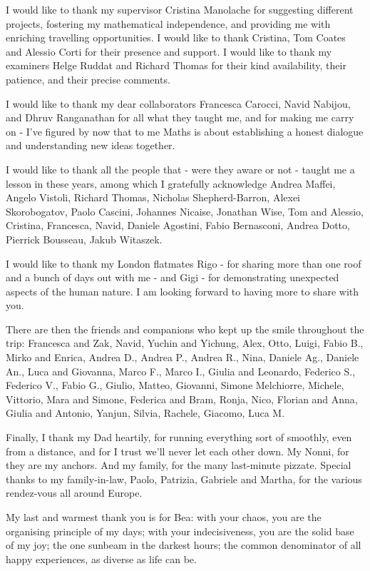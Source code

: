 \documentclass[a4paper,11pt,twoside,final]{book}
\theoremstyle{definition}
\theoremstyle{definition}
\numberwithin{equation}{chapter}    %
\numberwithin{section}{chapter} %
\begin{document}
{\thispagestyle{empty}

\null
\vfill


\medskip

\noindent I would like to thank my supervisor Cristina Manolache for suggesting different projects, fostering my mathematical independence, and providing me with enriching travelling opportunities. I would like to thank Cristina, Tom Coates and Alessio Corti for their presence and support. I would like to thank my examiners Helge Ruddat and Richard Thomas for their kind availability, their patience, and their precise comments.

I would like to thank my dear collaborators Francesca Carocci, Navid Nabijou, and Dhruv Ranganathan for all what they taught me, and for making me carry on - I've figured by now that to me Maths is about establishing a honest dialogue and understanding new ideas together.

I would like to thank all the people that - were they aware or not - taught me a lesson in these years, among which I gratefully acknowledge Andrea Maffei, Angelo Vistoli, Richard Thomas, Nicholas Shepherd-Barron, Alexei Skorobogatov, Paolo Cascini, Johannes Nicaise, Jonathan Wise, Tom and Alessio, Cristina, Francesca, Navid, Daniele Agostini, Fabio Bernasconi, Andrea Dotto, Pierrick Bousseau, Jakub Witaszek.

I would like to thank my London flatmates Rigo - for sharing more than one roof and a bunch of days out with me - and Gigi - for demonstrating unexpected aspects of the human nature. I am looking forward to having more to share with you.

There are then the friends and companions who kept up the smile throughout the trip: Francesca and Zak, Navid, Yuchin and Yichung, Alex, Otto, Luigi, Fabio B., Mirko and Enrica, Andrea D., Andrea P., Andrea R., Nina, Daniele Ag., Daniele An., Luca and Giovanna, Marco F., Marco I., Giulia and Leonardo, Federico S., Federico V., Fabio G., Giulio, Matteo, Giovanni, Simone Melchiorre, Michele, Vittorio, Mara and Simone, Federica and Bram, Ronja, Nico, Florian and Anna, Giulia and Antonio, Yanjun, Silvia, Rachele, Giacomo, Luca M.

Finally, I thank my Dad heartily, for running everything sort of smoothly, even from a distance, and for I trust we'll never let each other down. My Nonni, for they are my anchors. And my family, for the many last-minute pizzate. Special thanks to my family-in-law, Paolo, Patrizia, Gabriele and Martha, for the various rendez-vous all around Europe.

My last and warmest thank you is for Bea: with your chaos, you are the organising principle of my days; with your indecisiveness, you are the solid base of my joy; the one sunbeam in the darkest hours; the common denominator of all happy experiences, as diverse as life can be.
\vspace{2cm}
}
%
%
%
\end{document}
